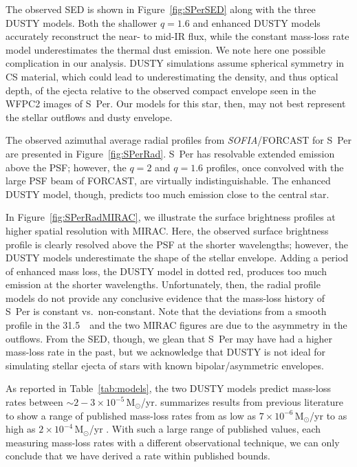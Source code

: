 \documentclass[modern]{aastex61}
\newcommand{\SOFIA}{{\it SOFIA}}
\begin{document}
The observed SED is shown in Figure~\ref{fig:SPerSED} along with the three DUSTY models. Both the shallower $q=1.6$ and enhanced DUSTY models accurately reconstruct the near- to mid-IR flux, while the constant mass-loss rate model underestimates the thermal dust emission. We note here one possible complication in our analysis. DUSTY simulations assume spherical symmetry in CS material, which could lead to underestimating the density, and thus optical depth, of the ejecta relative to the observed compact envelope seen in the \cite{schuster2006} WFPC2 images of S~Per.  Our models for this star, then, may not best represent the stellar outflows and dusty envelope.

The observed azimuthal average radial profiles from \SOFIA/FORCAST for S~Per are presented in Figure~\ref{fig:SPerRad}. S~Per has resolvable extended emission above the PSF; however, the $q=2$ and $q=1.6$ profiles, once convolved with the large PSF beam of FORCAST, are virtually indistinguishable.  The enhanced DUSTY model, though, predicts too much emission close to the central star.

In Figure~\ref{fig:SPerRadMIRAC}, we illustrate the surface brightness profiles at higher spatial resolution with MIRAC. Here, the observed surface brightness profile is clearly resolved above the PSF at the shorter wavelengths; however, the DUSTY models underestimate the shape of the stellar envelope.  Adding a period of enhanced mass loss, the DUSTY model in dotted red, produces too much emission at the shorter wavelengths.  Unfortunately, then, the radial profile models do not provide any conclusive evidence that the mass-loss history of S~Per is constant vs.\ non-constant.  Note that the deviations from a smooth profile in the 31.5~\micron\ and the two MIRAC figures are due to the asymmetry in the outflows. From the SED, though, we glean that S~Per may have had a higher mass-loss rate in the past, but we acknowledge that DUSTY is not ideal for simulating stellar ejecta of stars with known bipolar/asymmetric envelopes.

As reported in Table~\ref{tab:models}, the two DUSTY models predict mass-loss rates between $\sim2-3\times10^{-5}\,\mathrm{M}_\odot$/yr. \cite{richards1999} summarizes results from previous literature to show a range of published mass-loss rates from as low as $7\times10^{-6}\,\mathrm{M}_\odot$/yr \citep[OH 1612~MHz;][]{jura1990} to as high as $2\times10^{-4}\,\mathrm{M}_\odot$/yr \citep[CO-line profiles;][]{knapp1985}. With such a large range of published values, each measuring mass-loss rates with a different observational technique, we can only conclude that we have derived a rate within published bounds.
\end{document}
